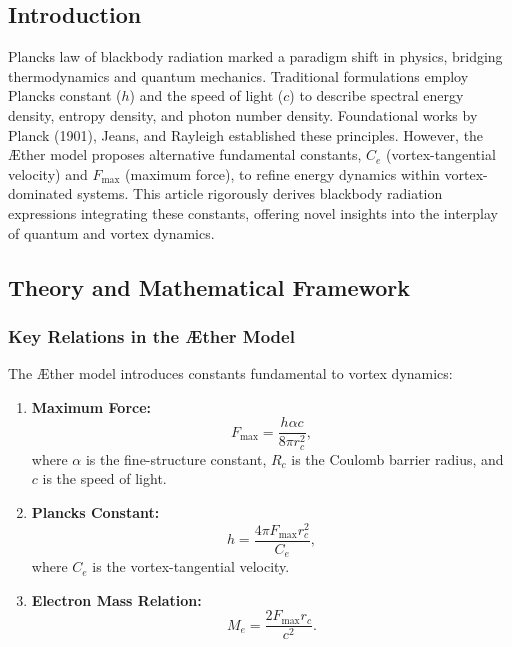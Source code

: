   \subsection*{Introduction}
  Planck\rqs s law of blackbody radiation marked a paradigm shift in physics, bridging thermodynamics and quantum mechanics. Traditional formulations employ Planck\rqs s constant ($h$) and the speed of light ($c$) to describe spectral energy density, entropy density, and photon number density. Foundational works by Planck (1901), Jeans, and Rayleigh established these principles. However, the Æther model proposes alternative fundamental constants, $C_e$ (vortex-tangential velocity) and $ F_{\max} $ (maximum force), to refine energy dynamics within vortex-dominated systems. This article rigorously derives blackbody radiation expressions integrating these constants, offering novel insights into the interplay of quantum and vortex dynamics.

  \subsection*{Theory and Mathematical Framework}

  \subsubsection*{Key Relations in the Æther Model}
  The Æther model introduces constants fundamental to vortex dynamics:

  \begin{enumerate}
   \item \textbf{Maximum Force:}
   \begin{equation*}
    F_{\max} = \frac{h \alpha c}{8 \pi r_c^2},
   \end{equation*}
   where $\alpha$ is the fine-structure constant, $R_c$ is the Coulomb barrier radius, and $c$ is the speed of light.

   \item \textbf{Planck\rqs s Constant:}
   \begin{equation*}
    h = \frac{4 \pi F_{\max} r_c^2}{C_e},
   \end{equation*}
   where $C_e$ is the vortex-tangential velocity.

   \item \textbf{Electron Mass Relation:}
   \begin{equation*}
    M_e = \frac{2 F_{\max} r_c}{c^2}.
   \end{equation*}
  \end{enumerate}

